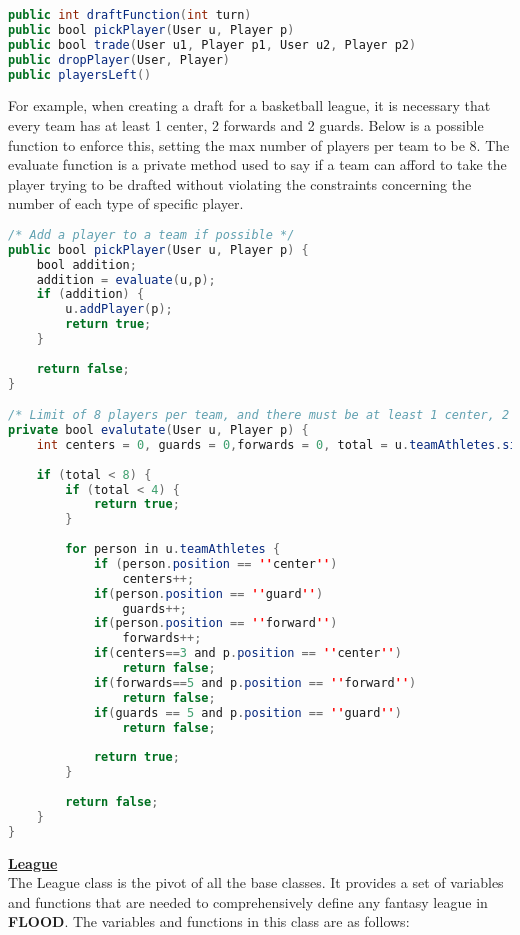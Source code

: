 \documentclass[12pt]{report}
\begin{document}
\begin{lstlisting}[language=Java,label=some-code,caption=Action]
public int draftFunction(int turn)
public bool pickPlayer(User u, Player p)
public bool trade(User u1, Player p1, User u2, Player p2)
public dropPlayer(User, Player)
public playersLeft()
\end{lstlisting}

\begin{doublespace}
For example, when creating a draft for a basketball league, it is necessary that every team has at least 1 center, 2 forwards and 2 guards. Below is a possible function to enforce this, setting the max number of players per team to be 8. The evaluate function is a private method used to say if a team can afford to take the player trying to be drafted without violating the constraints concerning the number of each type of specific player.
\end{doublespace}

\begin{lstlisting}[language=Java,label=some-code,caption=Action]
/* Add a player to a team if possible */
public bool pickPlayer(User u, Player p) {
	bool addition;
	addition = evaluate(u,p);
	if (addition) {
		u.addPlayer(p);
		return true;
	}
	
	return false;
}

/* Limit of 8 players per team, and there must be at least 1 center, 2 guards and 2 forwards per team. */
private bool evalutate(User u, Player p) {
	int centers = 0, guards = 0,forwards = 0, total = u.teamAthletes.size();
	
	if (total < 8) {
		if (total < 4) {
			return true;
		}
		
		for person in u.teamAthletes {
			if (person.position == ''center'')
				centers++;
			if(person.position == ''guard'')
				guards++;
			if(person.position == ''forward'')
				forwards++;
			if(centers==3 and p.position == ''center'')
				return false;
			if(forwards==5 and p.position == ''forward'')
				return false;
			if(guards == 5 and p.position == ''guard'')
				return false;
				
			return true;
		}
		
		return false;
	}
}
\end{lstlisting}

\begin{doublespace}
\textbf{\underline{League}}
\\
The League class is the pivot of all the base classes. It provides a set of variables and functions that are needed to comprehensively define any fantasy league in \textbf{FLOOD}. The variables and functions in this class are as follows:


\end{doublespace}
\end{document}
